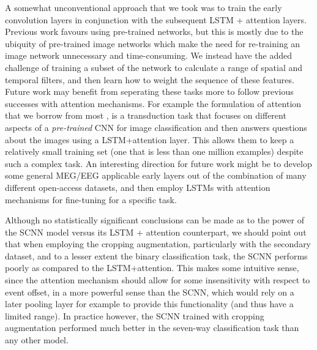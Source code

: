 \documentclass[utf8]{frontiersSCNS} %
\begin{document}
A somewhat unconventional approach that we took was to train the early convolution layers in conjunction with the subsequent LSTM + attention layers. Previous work favours using pre-trained networks, but this is mostly due to the ubiquity of pre-trained image networks which make the need for re-training an image network unnecessary and time-consuming. We instead have the added challenge of training a subset of the network to calculate a range of spatial and temporal filters, and then learn how to weight the sequence of these features. Future work may benefit from seperating these tasks more to follow previous successes with attention mechanisms. For example the formulation of attention that we borrow from most \cite{Zhu}, is a transduction task that focuses on different aspects of a {\em pre-trained} CNN for image classification and then answers questions about the images using a LSTM+attention layer. This allows them to keep a relatively small training set (one that is less than one million examples) despite such a complex task. An interesting direction for future work might be to develop some general MEG/EEG applicable early layers out of the combination of many different open-access datasets, and then employ LSTMs with attention mechanisms for fine-tuning for a specific task.

Although no statistically significant conclusions can be made as to the power of the SCNN model versus its LSTM + attention counterpart, we should point out that when employing the cropping augmentation, particularly with the secondary dataset, and to a lesser extent the binary classification task, the SCNN performs poorly as compared to the LSTM+attention. This makes some intuitive sense, since the attention mechanism should allow for some insensitivity with respect to event offset, in a more powerful sense than the SCNN, which would rely on a later pooling layer for example to provide this functionality (and thus have a limited range). In practice however, the SCNN trained with cropping augmentation performed much better in the seven-way classification task than any other model.

\end{document}
